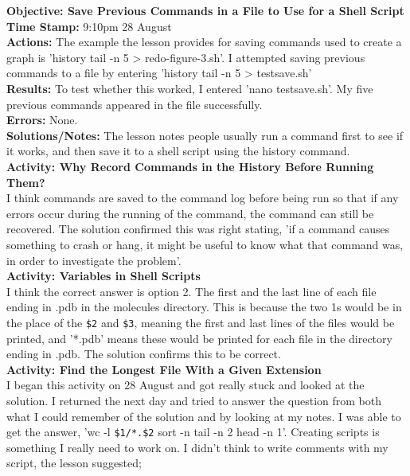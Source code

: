 \documentclass{article}
\begin{document}
\begin{FlushLeft}
\vspace{5mm}
\textbf{Objective: Save Previous Commands in a File to Use for a Shell Script}\\ 
\textbf{Time Stamp:} 9:10pm 28 August\\
\textbf{Actions:} The example the lesson provides for saving commands used to create a graph is 'history \textbar{} tail -n 5 \textgreater{}  redo-figure-3.sh'. I attempted saving previous commands to a file by entering 'history \textbar{} tail -n 5 \textgreater{}  testsave.sh' \\
\textbf{Results:} To test whether this worked, I entered 'nano testsave.sh'. My five previous commands appeared in the file successfully.\\
\textbf{Errors:} None.\\
\textbf{Solutions/Notes:} The lesson notes people usually run a command first to see if it works, and then save it to a shell script using the history command.\\
\vspace{5mm}
\textbf{Activity: Why Record Commands in the History Before Running Them?} \\
I think commands are saved to the command log before being run so that if any errors occur during the running of the command, the command can still be recovered. The solution confirmed this was right stating, 'if a command causes something to crash or hang, it might be useful to know what that command was, in order to investigate the problem'.\\
\vspace{5mm}
\textbf{Activity: Variables in Shell Scripts}\\
I think the correct answer is option 2. The first and the last line of each file ending in .pdb in the molecules directory. This is because the two 1s would be in the place of the \verb|$2| and \verb|$3|, meaning the first and last lines of the files would be printed, and '*.pdb' means these would be printed for each file in the directory ending in .pdb. The solution confirms this to be correct.\\
\vspace{5mm}
\textbf{Activity: Find the Longest File With a Given Extension} \\
I began this activity on 28 August and got really stuck and looked at the solution. I returned the next day and tried to answer the question from both what I could remember of the solution and by looking at my notes. I was able to get the answer, 'wc -l \verb|$1/*.$2| \textbar{} sort -n \textbar{} tail -n 2 \textbar{} head -n 1'. Creating scripts is something I really need to work on. I didn't think to write comments with my script, the lesson suggested;\\

\end{FlushLeft}
\end{document}
